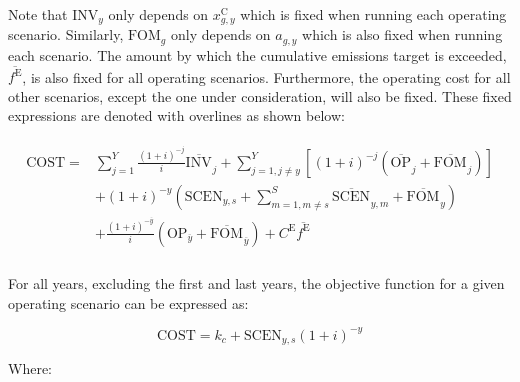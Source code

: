 \documentclass{article}
\newcommand{\sYears}{Y}
\newcommand{\sScenarios}{S}
\newcommand{\iGenerator}{g}
\newcommand{\iYear}{y}
\newcommand{\iYearTerminal}{\overline{\iYear}}
\newcommand{\iYearAlias}{j}
\newcommand{\iScenario}{s}
\newcommand{\iScenarioAlias}{m}
\newcommand{\cOperatingCost}[1][\iYear,\iScenario]{\mathrm{OP}_{#1}}
\newcommand{\cFixedOperationsMaintenanceCost}[1][\iGenerator]{\mathrm{FOM}_{#1}}
\newcommand{\cInvestmentCost}[1][\iYear]{\mathrm{INV}_{#1}}
\newcommand{\cInterestRate}{i}
\newcommand{\cEmissionsTargetViolationPenalty}{C^{\mathrm{E}}}
\newcommand{\cObjectiveFunction}{\mathrm{COST}}
\newcommand{\cOperatingCostScenario}[1][\iYear,\iScenario]{\mathrm{SCEN}_{#1}}
\newcommand{\vInstalledCapacity}[1][\iGenerator,\iYear]{x^{\mathrm{C}}_{#1}}
\newcommand{\vEmissionsTargetViolation}{f^{\mathrm{E}}}
\newcommand{\vInstalledCapacityTotal}[1][\iGenerator,\iYear]{a_{#1}}
\begin{document}
Note that $\cInvestmentCost$ only depends on $\vInstalledCapacity$ which is fixed when running each operating scenario. Similarly, $\cFixedOperationsMaintenanceCost$ only depends on $\vInstalledCapacityTotal$ which is also fixed when running each scenario. The amount by which the cumulative emissions target is exceeded, $\overline{\vEmissionsTargetViolation}$, is also fixed for all operating scenarios. Furthermore, the operating cost for all other scenarios, except the one under consideration, will also be fixed. These fixed expressions are denoted with overlines as shown below:

\begin{align}
	\begin{split}
		\cObjectiveFunction = & \sum\limits_{\iYearAlias=1}^{\sYears} \frac{(1+\cInterestRate)^{-\iYearAlias}}{\cInterestRate}\overline{\cInvestmentCost[]}_{\iYearAlias} + \sum\limits_{\iYearAlias=1, \iYearAlias \neq \iYear}^{\sYears} \left[(1+\cInterestRate)^{-\iYearAlias} (\overline{\cOperatingCost[]}_{\iYearAlias} + \overline{\cFixedOperationsMaintenanceCost[]}_{\iYearAlias}) \right]\\
		& + (1 + \cInterestRate)^{-\iYear}\left(\cOperatingCostScenario + \sum\limits_{\iScenarioAlias = 1,\iScenarioAlias\neq \iScenario}^{\sScenarios}\overline{\cOperatingCostScenario[]}_{\iYear,\iScenarioAlias} + \overline{\cFixedOperationsMaintenanceCost[]}_{\iYear}\right)\\
		& + \frac{(1+\cInterestRate)^{-\iYearTerminal}}{\cInterestRate} \left(\cOperatingCost[\iYearTerminal] + \overline{\cFixedOperationsMaintenanceCost[]}_{\iYearTerminal} \right) + \cEmissionsTargetViolationPenalty \overline{\vEmissionsTargetViolation}\\
	\end{split}
\end{align}


For all years, excluding the first and last years, the objective function for a given operating scenario can be expressed as:

\begin{equation}
	\cObjectiveFunction = k_{c} + \cOperatingCostScenario(1+\cInterestRate)^{-\iYear}
\end{equation}

Where:
\end{document}
